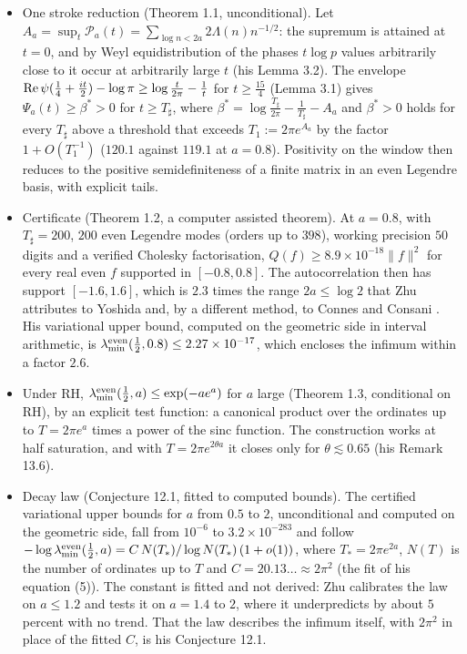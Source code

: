 \begin{itemize}
\item[(Z1)] One stroke reduction (Theorem 1.1, unconditional). Let $A_a=\sup_t\mathcal P_a(t)=\sum_{\log n<2a}2\Lambda(n)n^{-1/2}$: the supremum is attained at $t=0$, and by Weyl equidistribution of the phases $t\log p$ values arbitrarily close to it occur at arbitrarily large $t$ (his Lemma 3.2). The envelope $\operatorname{Re}\psi(\frac14+\frac{it}2)-\log\pi\ge\log\frac t{2\pi}-\frac1t$ for $t\ge\frac{15}4$ (Lemma 3.1) gives $\Psi_a(t)\ge\beta^*>0$ for $t\ge T_\sharp$, where $\beta^*=\log\frac{T_\sharp}{2\pi}-\frac1{T_\sharp}-A_a$ and $\beta^*>0$ holds for every $T_\sharp$ above a threshold that exceeds $T_1:=2\pi e^{A_a}$ by the factor $1+O(T_1^{-1})$ ($120.1$ against $119.1$ at $a=0.8$). Positivity on the window then reduces to the positive semidefiniteness of a finite matrix in an even Legendre basis, with explicit tails.
\item[(Z2)] Certificate (Theorem 1.2, a computer assisted theorem). At $a=0.8$, with $T_\sharp=200$, $200$ even Legendre modes (orders up to $398$), working precision $50$ digits and a verified Cholesky factorisation, $Q(f)\ge8.9\times10^{-18}\|f\|^2$ for every real even $f$ supported in $[-0.8,0.8]$. The autocorrelation then has support $[-1.6,1.6]$, which is $2.3$ times the range $2a\le\log2$ that Zhu attributes to Yoshida \cite{Yoshida92} and, by a different method, to Connes and Consani \cite{ConnesConsani21}. His variational upper bound, computed on the geometric side in interval arithmetic, is $\lambda^{\rm even}_{\min}(\frac12,0.8)\le2.27\times10^{-17}$, which encloses the infimum within a factor $2.6$.
\item[(Z3)] Under RH, $\lambda^{\rm even}_{\min}(\frac12,a)\le\exp(-ae^a)$ for $a$ large (Theorem 1.3, conditional on RH), by an explicit test function: a canonical product over the ordinates up to $T=2\pi e^a$ times a power of the sinc function. The construction works at half saturation, and with $T=2\pi e^{2\theta a}$ it closes only for $\theta\lesssim0.65$ (his Remark 13.6).
\item[(Z4)] Decay law (Conjecture 12.1, fitted to computed bounds). The certified variational upper bounds for $a$ from $0.5$ to $2$, unconditional and computed on the geometric side, fall from $10^{-6}$ to $3.2\times10^{-283}$ and follow $-\log\lambda^{\rm even}_{\min}(\frac12,a)=C\,N(T_*)/\log N(T_*)\,(1+o(1))$, where $T_*=2\pi e^{2a}$, $N(T)$ is the number of ordinates up to $T$ and $C=20.13\ldots\approx2\pi^2$ (the fit of his equation (5)). The constant is fitted and not derived: Zhu calibrates the law on $a\le1.2$ and tests it on $a=1.4$ to $2$, where it underpredicts by about $5$ percent with no trend. That the law describes the infimum itself, with $2\pi^2$ in place of the fitted $C$, is his Conjecture 12.1.

\end{itemize}
